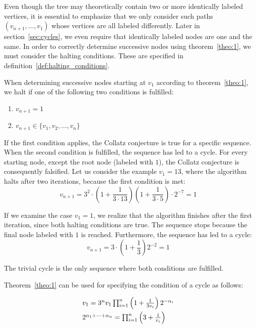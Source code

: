 Even though the tree may theoretically contain two or more identically labeled vertices, it is essential to emphasize that we only consider such paths $(v_{n+1},\ldots,v_1)$ whose vertices are all labeled differently. Later in section~\ref{sec:cycles}, we even require that identically labeled nodes are one and the same. In order to correctly determine successive nodes using theorem~\ref{theo:1}, we must consider the halting conditions. These are specified in definition~\ref{def:halting_conditions}.

\begin{definition}
	\label{def:halting_conditions}
	When determining successive nodes starting at $v_1$ according to theorem~\ref{theo:1}, we halt if one of the following two conditions is fulfilled:
	\begin{enumerate}
		\item $v_{n+1}=1$
		\item $v_{n+1}\in\{v_1,v_2,\ldots,v_n\}$
	\end{enumerate}
	If the first condition applies, the Collatz conjecture is true for a specific sequence. When the second condition is fulfilled, the sequence has led to a cycle. For every starting node, except the root node (labeled with $1$), the Collatz conjecture is consequently falsified. Let us consider the example $v_1=13$, where the algorithm halts after two iterations, because the first condition is met:
	\[
	v_{n+1}=3^2\cdot\left(1+\frac{1}{3\cdot13}\right)\left(1+\frac{1}{3\cdot5}\right)\cdot2^{-7}=1
	\]
	
	If we examine the case $v_{1}=1$, we realize that the algorithm finishes after the first iteration, since both halting conditions are true. The sequence stops because the final node labeled with $1$ is reached. Furthermore, the sequence has led to a cycle:
	\[
	v_{n+1}=3\cdot\left(1+\frac{1}{3}\right)2^{-2}=1
	\]
	
	The trivial cycle is the only sequence where both conditions are fulfilled.
\end{definition}

\noindent
Theorem~\ref{theo:1} can be used for specifying the condition of a cycle as follows:

\begin{equation}
\label{eq:func_cycle}
\begin{array}{l}
v_{1}=3^nv_1\prod_{i=1}^{n}\left(1+\frac{1}{3v_i}\right)2^{-\alpha_i}
\\[\medskipamount]
2^{\alpha_1+\cdots+\alpha_n}=\prod_{i=1}^{n}\left(3+\frac{1}{v_i}\right)
\end{array}
\end{equation}

